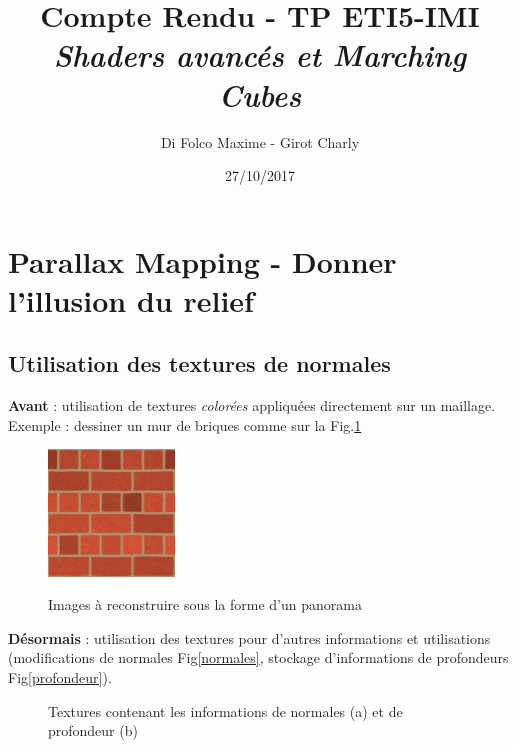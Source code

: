 \documentclass[a4paper]{article}
\title{Compte Rendu - TP ETI5-IMI \\ \textit{Shaders avancés et Marching Cubes}}
\author{Di Folco Maxime - Girot Charly}
\date{27/10/2017}
\begin{document}
\maketitle

\section{Parallax Mapping - Donner l'illusion du relief}
\subsection{Utilisation des textures de normales}
\textbf{Avant} : utilisation de textures \textit{colorées} appliquées directement sur un maillage. Exemple : dessiner un mur de briques comme sur la Fig.\ref{briques}

\begin{figure}[H]
\centering
\includegraphics[width=0.3\textwidth]{figures/brick_diffuse.png}\label{briques}
\caption{Images à reconstruire sous la forme d'un panorama}
\end{figure}


\textbf{Désormais} : utilisation des textures pour d'autres informations et utilisations (modifications de normales Fig\ref{normales}, stockage d'informations de profondeurs Fig\ref{profondeur}). 

\begin{figure}[H]
\centering
{}
\caption{Textures contenant les informations de normales (a) et de profondeur (b)}
\end{figure}
\end{document}
